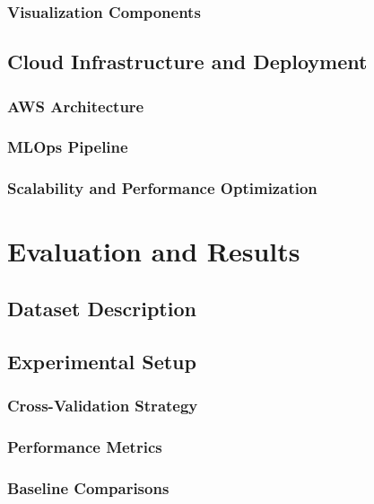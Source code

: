 \documentclass[conference]{IEEEtran}
\begin{document}
\subsubsection{Visualization Components}

\subsection{Cloud Infrastructure and Deployment}

\subsubsection{AWS Architecture}

\subsubsection{MLOps Pipeline}

\subsubsection{Scalability and Performance Optimization}

\section{Evaluation and Results}

\subsection{Dataset Description}

\subsection{Experimental Setup}

\subsubsection{Cross-Validation Strategy}

\subsubsection{Performance Metrics}

\subsubsection{Baseline Comparisons}
\end{document}
